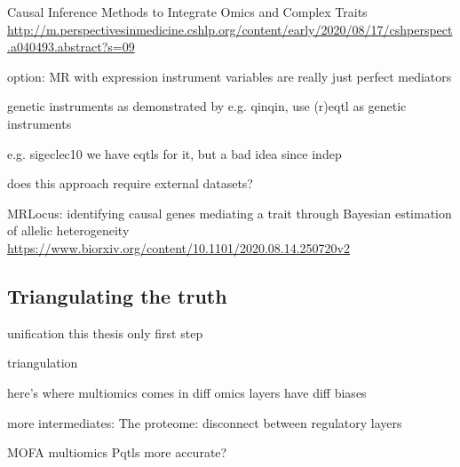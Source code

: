 \begin{outline}
            Causal Inference Methods to Integrate Omics and Complex Traits
            \url{http://m.perspectivesinmedicine.cshlp.org/content/early/2020/08/17/cshperspect.a040493.abstract?s=09}


    option: MR with expression 
        instrument variables are really just perfect mediators

        genetic instruments
        as demonstrated by e.g. qinqin, use (r)eqtl as genetic instruments

        e.g. sigeclec10
        we have eqtls for it, but a bad idea since indep

        does this approach require external datasets?

        MRLocus: identifying causal genes mediating a trait through Bayesian estimation of allelic heterogeneity
        \url{https://www.biorxiv.org/content/10.1101/2020.08.14.250720v2}

\subsection{Triangulating the truth}


unification
    this thesis only first step

    triangulation

    here's where multiomics comes in
    diff omics layers have diff biases

    more intermediates:
        The proteome: disconnect between regulatory layers


    MOFA
    multiomics
        Pqtls more accurate?


\end{outline}
